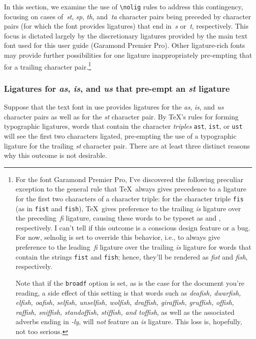 \documentclass[11pt]{article}
\newcommand{\pkg}[1]{\textsf{#1}}
\newcommand{\opt}[1]{\texttt{#1}}
\newcommand{\cmmd}[1]{\texttt{\textbackslash #1}}
\begin{document}
In this section, we examine the use of \cmmd{nolig} rules to address this contingency, focusing on cases of~\emph{st}, \emph{sp}, \emph{th}, and~\emph{ta} character pairs being preceded by character pairs (for which the font provides ligatures) that end in~\emph{s} or~\emph{t}, respectively. This focus is dictated largely by the discretionary ligatures provided by the main text font used for this user guide (Garamond Premier Pro). Other ligature-rich fonts may provide further possibilities for one ligature inappropriately pre-empting that for a trailing character pair.\footnote{For the font Garamond Premier Pro, I've discovered the following preculiar exception to the general rule that \TeX\ always gives precedence to a ligature for the first two characters of a character triple: for the character triple \opt{fis} (as in \opt{fist} and \opt{fish}), \TeX\ gives preference to the trailing \emph{is} ligature over the preceding\, \emph{fi} ligature, causing these words to be typeset as \emph{} and \emph{}, respectively. I can't tell if this outcome is a conscious design feature or a bug. For now, \pkg{selnolig} is set to override this behavior, i.e., to always give preference to the leading\, \emph{fi} ligature over the trailing \emph{is} ligature for words that contain the strings \opt{fist} and \opt{fish}; hence, they'll be rendered as \emph{fist} and \emph{fish}, respectively. 

Note that if the \opt{broadf} option is set, as is the case for the document you're reading, a side effect of this setting is that words such as \emph{deafish, dwarfish, elfish, oafish, selfish, unselfish, wolfish, draffish, giraffish, gruffish, offish, raffish, sniffish, standoffish, stiffish, \emph{and} toffish}, as well as the associated adverbs ending in \emph{-ly}, will \emph{not} feature an \emph{is} ligature. This loss is, hopefully, not too serious.}



\subsubsection*{Ligatures for \emph{as}, \emph{is}, and \emph{us} that pre-empt an \emph{st} ligature}

Suppose that the text font in use provides ligatures for the \emph{as}, \emph{is}, and \emph{us} character pairs as well as for the \emph{st} character pair. By \TeX's rules for forming typographic ligatures, words that contain the character \emph{triples} \opt{ast}, \opt{ist}, or \opt{ust} will see the first two characters ligated, pre-empting the use of a typographic ligature for the trailing \emph{st} character pair. There are at least three distinct reasons why this outcome is not desirable.
\end{document}
